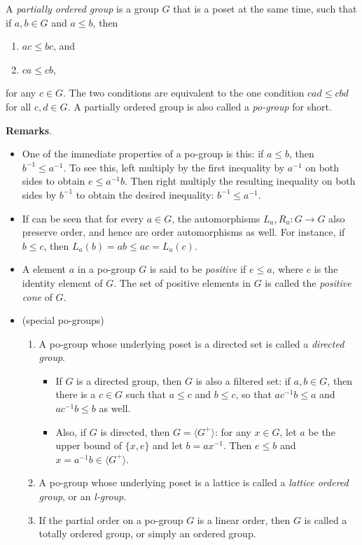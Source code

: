 \documentclass[12pt]{article}
\begin{document}
A \emph{partially ordered group} is a group $G$ that is a poset at the same time, such that if $a,b\in G$ and $a\le b$, then
\begin{enumerate}
\item $ac\le bc$, and
\item $ca\le cb$,
\end{enumerate}
for any $c\in G$.  The two conditions are equivalent to the one condition $cad\le cbd$ for all $c,d\in G$.  A partially ordered group is also called a \emph{po-group} for short.

\textbf{Remarks}.
\begin{itemize}
\item
One of the immediate properties of a po-group is this: if $a\le b$, then $b^{-1}\le a^{-1}$.  To see this, left multiply by the first inequality by $a^{-1}$ on both sides to obtain $e\le a^{-1}b$.  Then right multiply the resulting inequality on both sides by $b^{-1}$ to obtain the desired inequality: $b^{-1}\le a^{-1}$.
\item
If can be seen that for every $a\in G$, the automorphisms $L_a,R_a:G\to G$ also preserve order, and hence are order automorphisms as well.  For instance, if $b\le c$, then $L_a(b)=ab\le ac = L_a(c)$.
\item
A element $a$ in a po-group $G$ is said to be \emph{positive} if $e\le a$, where $e$ is the identity element of $G$.  The set of positive elements in $G$ is called the \emph{positive cone} of $G$.
\item (special po-groups)
\begin{enumerate}
\item A po-group whose underlying poset is a directed set is called a \emph{directed group}.  
\begin{itemize}
\item
If $G$ is a directed group, then $G$ is also a filtered set: if $a,b\in G$, then there is a $c\in G$ such that $a\le c$ and $b\le c$, so that $ac^{-1}b\le a$ and $ac^{-1}b\le b$ as well.
\item
Also, if $G$ is directed, then $G=\langle G^+\rangle$: for any $x\in G$, let $a$ be the upper bound of $\lbrace x,e\rbrace$ and let $b=ax^{-1}$.  Then $e\le b$ and $x=a^{-1}b\in \langle G^+\rangle$.
\end{itemize}
\item A po-group whose underlying poset is a lattice is called a \emph{lattice ordered group}, or an \emph{l-group}.
\item If the partial order on a po-group $G$ is a linear order, then $G$ is called a totally ordered group, or simply an ordered group.

\end{enumerate}
\end{itemize}
\end{document}
